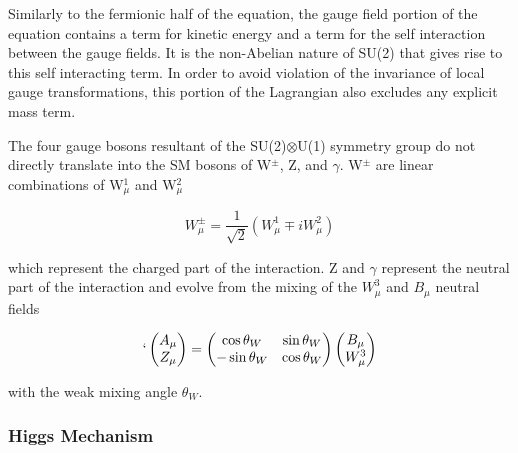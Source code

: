 \documentclass[12pt,a4paper,epsf,portrait,times,epsfig]{article}
\begin{document}
		Similarly to the fermionic half of the equation, the gauge field portion of the equation contains a term for kinetic energy and a term for the self interaction between the gauge fields. It is the non-Abelian nature of SU(2) that gives rise to this self interacting term. In order to avoid violation of the invariance of local gauge transformations, this portion of the Lagrangian also excludes any explicit mass term. \par
		
		The four gauge bosons resultant of the SU(2)$ \otimes$U(1) symmetry group do not directly translate into the SM bosons of W$^{\pm}$, Z, and $\gamma$. W$^{\pm}$ are linear combinations of W$_{\mu}^{1}$ and W$_{\mu}^{2}$
		
		\begin{center}
			\begin{equation}
				W_{\mu}^{\pm} = \frac{1}{\sqrt{2}}(W_{\mu}^{1}\mp iW_{\mu}^{2})
			\end{equation}
		\end{center}
	
		which represent the charged part of the interaction. Z and $\gamma$ represent the neutral part of the interaction and evolve from the mixing of the $W_{\mu}^{3}$ and $B_{\mu}$ neutral fields
		
		\begin{align}
		\begin{split}`
			\begin{pmatrix}
				A_{\mu}  \\
				Z_{\mu}  \\
			\end{pmatrix}=\begin{pmatrix}
				\cos \theta_{W}  & \sin \theta_{W} \\
				-\sin \theta_{W} & \cos \theta_{W} \\
			\end{pmatrix} \begin{pmatrix}
				B_{\mu} \\
				W_{\mu}^{3} \\
			\end{pmatrix}
		\end{split}
		\end{align}	
		
		with the weak mixing angle $\theta_{W}$. 
		
		\subsubsection{Higgs Mechanism}
		
\end{document}
